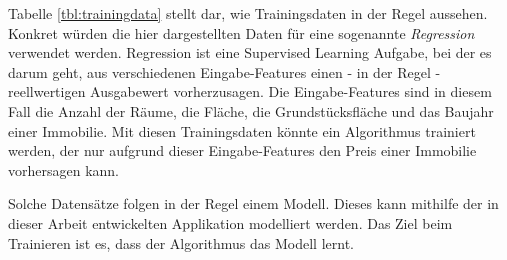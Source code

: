 Tabelle \ref{tbl:trainingdata} stellt dar, wie Trainingsdaten in der Regel aussehen. Konkret würden die hier dargestellten Daten für eine sogenannte \textit{Regression} verwendet werden. Regression ist eine Supervised Learning Aufgabe, bei der es darum geht, aus verschiedenen Eingabe-Features einen - in der Regel - reellwertigen Ausgabewert vorherzusagen. Die Eingabe-Features sind in diesem Fall die Anzahl der Räume, die Fläche, die Grundstücksfläche und das Baujahr einer Immobilie. Mit diesen Trainingsdaten könnte ein Algorithmus trainiert werden, der nur aufgrund dieser Eingabe-Features den Preis einer Immobilie vorhersagen kann.

Solche Datensätze folgen in der Regel einem Modell. Dieses kann mithilfe der in dieser Arbeit entwickelten Applikation modelliert werden. Das Ziel beim Trainieren ist es, dass der Algorithmus das Modell lernt.